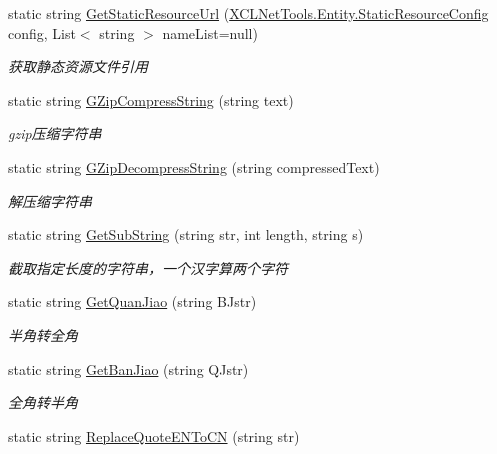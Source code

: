 \begin{DoxyCompactItemize}
static string \hyperlink{class_x_c_l_net_tools_1_1_string_hander_1_1_common_aab3a93f5a39ca48480843f83910fdc8f}{Get\-Static\-Resource\-Url} (\hyperlink{class_x_c_l_net_tools_1_1_entity_1_1_static_resource_config}{X\-C\-L\-Net\-Tools.\-Entity.\-Static\-Resource\-Config} config, List$<$ string $>$ name\-List=null)
\begin{DoxyCompactList}\small\item\em 获取静态资源文件引用 \end{DoxyCompactList}\item 
static string \hyperlink{class_x_c_l_net_tools_1_1_string_hander_1_1_common_a54ebd6d07f38edf16bad5a5b0c3a08a6}{G\-Zip\-Compress\-String} (string text)
\begin{DoxyCompactList}\small\item\em gzip压缩字符串 \end{DoxyCompactList}\item 
static string \hyperlink{class_x_c_l_net_tools_1_1_string_hander_1_1_common_a8bb3947a43d3fff8716bdb6127c712e2}{G\-Zip\-Decompress\-String} (string compressed\-Text)
\begin{DoxyCompactList}\small\item\em 解压缩字符串 \end{DoxyCompactList}\item 
static string \hyperlink{class_x_c_l_net_tools_1_1_string_hander_1_1_common_a7e09ea6b3ad85e825e7623017e3e3f6b}{Get\-Sub\-String} (string str, int length, string s)
\begin{DoxyCompactList}\small\item\em 截取指定长度的字符串，一个汉字算两个字符 \end{DoxyCompactList}\item 
static string \hyperlink{class_x_c_l_net_tools_1_1_string_hander_1_1_common_ac4c5c91417fc48267b8c2600bb857dca}{Get\-Quan\-Jiao} (string B\-Jstr)
\begin{DoxyCompactList}\small\item\em 半角转全角 \end{DoxyCompactList}\item 
static string \hyperlink{class_x_c_l_net_tools_1_1_string_hander_1_1_common_a2951e9d8596697ebd7b2f454d9253d91}{Get\-Ban\-Jiao} (string Q\-Jstr)
\begin{DoxyCompactList}\small\item\em 全角转半角 \end{DoxyCompactList}\item 
static string \hyperlink{class_x_c_l_net_tools_1_1_string_hander_1_1_common_af1c235bbfc59dedcaeb0731301226c3b}{Replace\-Quote\-E\-N\-To\-C\-N} (string str)

\end{DoxyCompactItemize}
